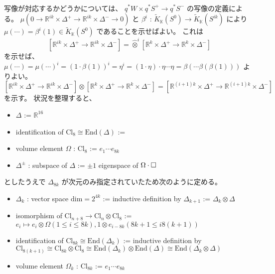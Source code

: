 \documentclass[dvipdfmx]{jsarticle}
\newcommand{\KtheoryReduced}[1]{\tilde{K}_{\mathbb{K}}(#1)}
\begin{document}
\begin{Proof}
\begin{align*}
    [\mathbb{R}^{ik} \times \Delta^+ &\to \mathbb{R}^{ik} \times \Delta^-]
  \end{align*}
  写像が対応するかどうかについては、 \(q^* W \times q^* S^+ \to q^*S^-\) の写像の定義による。
  \(\mu(0 \to \mathbb{R}^{ik} \times \Delta^+ \to \mathbb{R}^{ik} \times \Delta^- \to 0)\) と \(\beta^i\) : \(\KtheoryReduced{S^0} \to \KtheoryReduced{S^{ik}}\) により \(\mu(\cdots) = \beta^i(1) \in \KtheoryReduced{S^0}\) であることを示せばよい。
  これは
  \[[\mathbb{R}^{ik} \times \Delta^+ \to \mathbb{R}^{ik} \times \Delta^-] = \hat{\otimes}^i [\mathbb{R}^{k} \times \Delta^+ \to \mathbb{R}^{k} \times \Delta^-]\] を示せば、 \(\mu(\cdots) = \mu(\cdots)^{i} = (1 \cdot \beta(1))^i = \eta^i = (1 \cdot \eta) \cdot \eta \cdots \eta = \beta(\cdots \beta(\beta(1)))\) よりよい。
\itemthen
  \([\mathbb{R}^{ik} \times \Delta^{+} \to \mathbb{R}^{ik} \times \Delta^-] \otimes [\mathbb{R}^{k} \times \Delta^+ \to \mathbb{R}^{k} \times \Delta^-] = [\mathbb{R}^{(i+1)k} \times \Delta^+ \to \mathbb{R}^{(i+1)k} \times \Delta^-]\) を示す。
  状況を整理すると、
  \begin{itemize}
    \item \(\Delta\) := \(\mathbb{R}^{16}\)
    \item identification of \(\text{Cl}_{8} \cong \text{End}(\Delta)\) := 
    \item volume element \(\Omega\) : \(\text{Cl}_{8}\) := \(e_{1} \cdots e_{8k}\)
    \item \(\Delta^{\pm}\) : subspace of \(\Delta\) := \(\pm 1\) eigenspace of \(\Omega \cdot \square\)
  \end{itemize}
  としたうえで \(\Delta_{8k}\) が次元のみ指定されていたため次のように定める。
  \begin{itemize}
    \item \(\Delta_{k}\) : vector space \(\text{dim}=2^{4k}\) := inductive definition by \(\Delta_{k+1}\) := \(\Delta_{k} \otimes \Delta\)
    \item isomorphism of \(\text{Cl}_{n+8} \to \text{Cl}_{n} \otimes \text{Cl}_{8}\) := \(e_{i} \mapsto e_{i} \otimes \Omega (1 \leq i \leq 8k), 1 \otimes e_{i-8k} (8k+1 \leq i 8(k+1))\)
    \item identification of \(\text{Cl}_{8k} \cong \text{End}(\Delta_{k})\) := inductive definition by \\
    \(\text{Cl}_{8(k+1)} \cong \text{Cl}_{8k} \otimes \text{Cl}_{8} \cong \text{End}(\Delta_{k}) \otimes \text{End}(\Delta) \cong \text{End}(\Delta_{k} \otimes \Delta)\)
    \item volume element \(\Omega_{k}\) : \(\text{Cl}_{8k}\) := \(e_{1} \cdots e_{8k}\)

\end{itemize}
\end{Proof}
\end{document}
